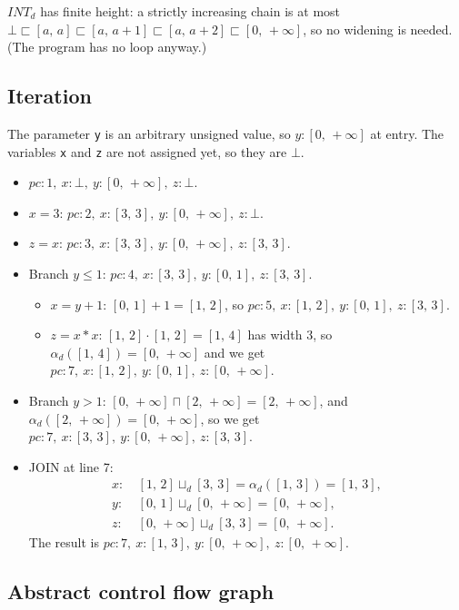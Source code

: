 \documentclass[11pt,a4paper]{article}
\newcommand{\stz}[4]{$\mathit{pc}\colon #1,\allowbreak\ x\colon #2,\allowbreak\ y\colon #3,\allowbreak\ z\colon #4$}
\newcommand{\itv}[2]{[#1,\,#2]}
\newcommand{\pinf}{+\infty}
\newcommand{\INTd}{\mathit{INT}_d}
\begin{document}
$\INTd$ has finite height: a strictly increasing chain is at most
$\bot \sqsubset \itv{a}{a} \sqsubset \itv{a}{a+1} \sqsubset \itv{a}{a+2} \sqsubset \itv{0}{\pinf}$,
so no widening is needed. (The program has no loop anyway.)

\subsection*{Iteration}

The parameter \texttt{y} is an arbitrary unsigned value, so $y\colon\itv{0}{\pinf}$ at entry.
The variables \texttt{x} and \texttt{z} are not assigned yet, so they are $\bot$.
\begin{itemize}
  \item \stz{1}{\bot}{\itv{0}{\pinf}}{\bot}.
  \item $x = 3$: \stz{2}{\itv{3}{3}}{\itv{0}{\pinf}}{\bot}.
  \item $z = x$: \stz{3}{\itv{3}{3}}{\itv{0}{\pinf}}{\itv{3}{3}}.
  \item Branch $y \le 1$: \stz{4}{\itv{3}{3}}{\itv{0}{1}}{\itv{3}{3}}.
        \begin{itemize}
          \item $x = y + 1$: $\itv{0}{1} + 1 = \itv{1}{2}$, so \stz{5}{\itv{1}{2}}{\itv{0}{1}}{\itv{3}{3}}.
          \item $z = x * x$: $\itv{1}{2} \cdot \itv{1}{2} = \itv{1}{4}$ has width 3, so
                $\alpha_d(\itv{1}{4}) = \itv{0}{\pinf}$ and we get
                \stz{7}{\itv{1}{2}}{\itv{0}{1}}{\itv{0}{\pinf}}.
        \end{itemize}
  \item Branch $y > 1$: $\itv{0}{\pinf} \sqcap \itv{2}{\pinf} = \itv{2}{\pinf}$, and
        $\alpha_d(\itv{2}{\pinf}) = \itv{0}{\pinf}$, so we get
        \stz{7}{\itv{3}{3}}{\itv{0}{\pinf}}{\itv{3}{3}}.
  \item JOIN at line 7:
        \begin{align*}
          x\colon\ & \itv{1}{2} \sqcup_d \itv{3}{3} = \alpha_d(\itv{1}{3}) = \itv{1}{3}, \\
          y\colon\ & \itv{0}{1} \sqcup_d \itv{0}{\pinf} = \itv{0}{\pinf}, \\
          z\colon\ & \itv{0}{\pinf} \sqcup_d \itv{3}{3} = \itv{0}{\pinf}.
        \end{align*}
        The result is \stz{7}{\itv{1}{3}}{\itv{0}{\pinf}}{\itv{0}{\pinf}}.
\end{itemize}

\subsection*{Abstract control flow graph}
\end{document}
